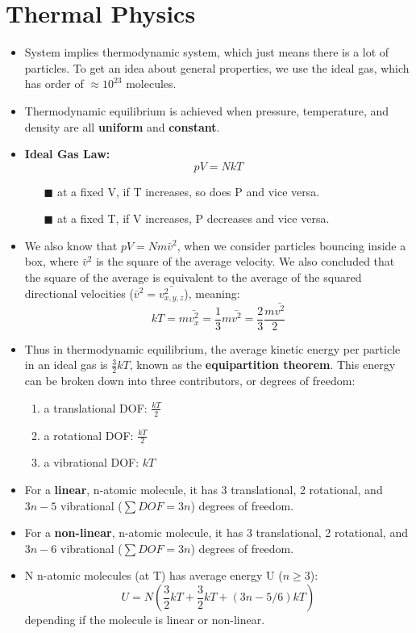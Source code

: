 \documentclass[12pt, letterpaper, twoside]{article}
\begin{document}
\section{Thermal Physics}
\begin{itemize}
    \item System implies thermodynamic system, which just means there is a lot of particles. To get an idea about general properties, we use the ideal gas, which has order of $\approx 10^{23}$ molecules.
    \item Thermodynamic equilibrium is achieved when pressure, temperature, and density are all \textbf{uniform} and \textbf{constant}.
    \item \textbf{Ideal Gas Law:}
    \begin{equation}
        pV = NkT
    \end{equation}
    \begin{itemize}
        \item[$\blacksquare$] at a fixed V, if T increases, so does P and vice versa.
        \item[$\blacksquare$] at a fixed T, if V increases, P decreases and vice versa.
    \end{itemize}
    \item We also know that $pV = Nm\bar{v}^2$, when we consider particles bouncing inside a box, where $\bar{v}^2$ is the square of the average velocity. We also concluded that the square of the average is equivalent to the average of the squared directional velocities ($\bar{v}^2 = \bar{v_{x,y,z}^2}$), meaning:
    \begin{equation*}
        kT = m\bar{v_x^2} = \frac{1}{3}m\bar{v^2} = \frac{2}{3}\frac{m\bar{v^2}}{2}
    \end{equation*}
    \item Thus in thermodynamic equilibrium, the average kinetic energy per particle in an ideal gas is $\frac{3}{2}kT$, known as the \textbf{equipartition theorem}. This energy can be broken down into three contributors, or degrees of freedom:
    \begin{enumerate}
        \item a translational DOF: $\frac{kT}{2}$
        \item a rotational DOF: $\frac{kT}{2}$
        \item a vibrational DOF: $kT$
    \end{enumerate}
    \item For a \textbf{linear}, n-atomic molecule, it has 3 translational, 2 rotational, and $3n - 5$ vibrational ($\sum DOF = 3n$) degrees of freedom.
    \item For a \textbf{non-linear}, n-atomic molecule, it has 3 translational, 2 rotational, and $3n - 6$ vibrational ($\sum DOF = 3n$) degrees of freedom.
    \item N n-atomic molecules (at T) has average energy U ($n \geq 3$):
    \begin{equation}
        U = N (\frac{3}{2}kT + \frac{3}{2}kT + (3n - 5/6)kT)
    \end{equation}
    depending if the molecule is linear or non-linear.
\end{itemize}
\end{document}
